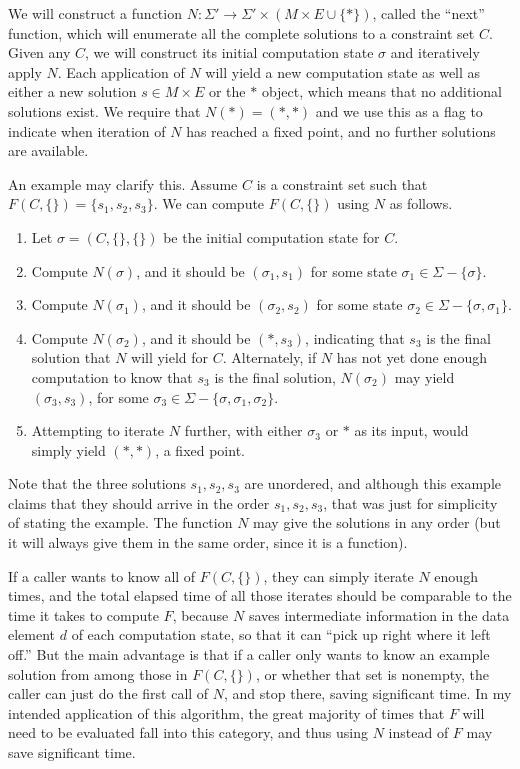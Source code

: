 \documentclass{article}
\begin{document}
We will construct a function $N:\Sigma'\to\Sigma'\times(M\times E\cup\{*\})$, called the ``next'' function, which will enumerate all the complete solutions to a constraint set $C$.  Given any $C$, we will construct its initial computation state $\sigma$ and iteratively apply $N$.  Each application of $N$ will yield a new computation state as well as either a new solution $s\in M\times E$ or the $*$ object, which means that no additional solutions exist.  We require that $N(*)=(*,*)$ and we use this as a flag to indicate when iteration of $N$ has reached a fixed point, and no further solutions are available.

An example may clarify this.  Assume $C$ is a constraint set such that $F(C,\{\})=\{s_1,s_2,s_3\}$.  We can compute $F(C,\{\})$ using $N$ as follows.
\begin{enumerate}
\item	Let $\sigma=(C,\{\},\{\})$ be the initial computation state for $C$.
\item	Compute $N(\sigma)$, and it should be $(\sigma_1,s_1)$ for some state $\sigma_1\in\Sigma-\{\sigma\}$.
\item	Compute $N(\sigma_1)$, and it should be $(\sigma_2,s_2)$ for some state $\sigma_2\in\Sigma-\{\sigma,\sigma_1\}$.
\item	Compute $N(\sigma_2)$, and it should be $(*,s_3)$, indicating that $s_3$ is the final solution that $N$ will yield for $C$.  Alternately, if $N$ has not yet done enough computation to know that $s_3$ is the final solution, $N(\sigma_2)$ may yield $(\sigma_3,s_3)$, for some $\sigma_3\in\Sigma-\{\sigma,\sigma_1,\sigma_2\}$.
\item	Attempting to iterate $N$ further, with either $\sigma_3$ or $*$ as its input, would simply yield $(*,*)$, a fixed point.
\end{enumerate}
Note that the three solutions $s_1,s_2,s_3$ are unordered, and although this example claims that they should arrive in the order $s_1,s_2,s_3$, that was just for simplicity of stating the example.  The function $N$ may give the solutions in any order (but it will always give them in the same order, since it is a function).

If a caller wants to know all of $F(C,\{\})$, they can simply iterate $N$ enough times, and the total elapsed time of all those iterates should be comparable to the time it takes to compute $F$, because $N$ saves intermediate information in the data element $d$ of each computation state, so that it can ``pick up right where it left off.''  But the main advantage is that if a caller only wants to know an example solution from among those in $F(C,\{\})$, or whether that set is nonempty, the caller can just do the first call of $N$, and stop there, saving significant time.  In my intended application of this algorithm, the great majority of times that $F$ will need to be evaluated fall into this category, and thus using $N$ instead of $F$ may save significant time.
\end{document}
